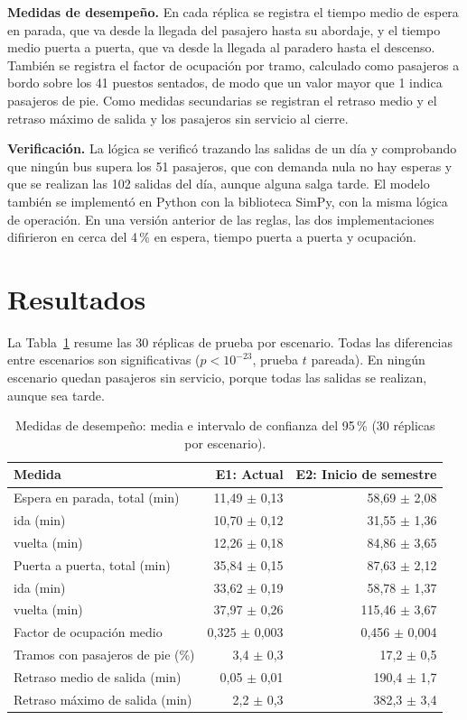 \documentclass[runningheads]{llncs}
\begin{document}
\textbf{Medidas de desempeño.} En cada réplica se registra el tiempo medio de espera en parada, que va desde la llegada del pasajero hasta su abordaje, y el tiempo medio puerta a puerta, que va desde la llegada al paradero hasta el descenso. También se registra el factor de ocupación por tramo, calculado como pasajeros a bordo sobre los 41 puestos sentados, de modo que un valor mayor que 1 indica pasajeros de pie. Como medidas secundarias se registran el retraso medio y el retraso máximo de salida y los pasajeros sin servicio al cierre.

\textbf{Verificación.} La lógica se verificó trazando las salidas de un día y comprobando que ningún bus supera los 51 pasajeros, que con demanda nula no hay esperas y que se realizan las 102 salidas del día, aunque alguna salga tarde. El modelo también se implementó en Python con la biblioteca SimPy, con la misma lógica de operación. En una versión anterior de las reglas, las dos implementaciones difirieron en cerca del 4\,\% en espera, tiempo puerta a puerta y ocupación.

\section{Resultados}

La Tabla~\ref{tab:resultados} resume las 30 réplicas de prueba por escenario. Todas las diferencias entre escenarios son significativas ($p<10^{-23}$, prueba $t$ pareada). En ningún escenario quedan pasajeros sin servicio, porque todas las salidas se realizan, aunque sea tarde.

\begin{table}[t]
\centering
\caption{Medidas de desempeño: media e intervalo de confianza del 95\,\% (30 réplicas por escenario).}
\label{tab:resultados}
\setlength{\tabcolsep}{6pt}
\begin{tabular}{lrr}
\toprule
Medida & E1: Actual & E2: Inicio de semestre\\
\midrule
Espera en parada, total (min) & 11,49 $\pm$ 0,13 & 58,69 $\pm$ 2,08\\
\quad ida (min) & 10,70 $\pm$ 0,12 & 31,55 $\pm$ 1,36\\
\quad vuelta (min) & 12,26 $\pm$ 0,18 & 84,86 $\pm$ 3,65\\
Puerta a puerta, total (min) & 35,84 $\pm$ 0,15 & 87,63 $\pm$ 2,12\\
\quad ida (min) & 33,62 $\pm$ 0,19 & 58,78 $\pm$ 1,37\\
\quad vuelta (min) & 37,97 $\pm$ 0,26 & 115,46 $\pm$ 3,67\\
Factor de ocupación medio & 0,325 $\pm$ 0,003 & 0,456 $\pm$ 0,004\\
Tramos con pasajeros de pie (\%) & 3,4 $\pm$ 0,3 & 17,2 $\pm$ 0,5\\
Retraso medio de salida (min) & 0,05 $\pm$ 0,01 & 190,4 $\pm$ 1,7\\
Retraso máximo de salida (min) & 2,2 $\pm$ 0,3 & 382,3 $\pm$ 3,4\\
\bottomrule
\end{tabular}
\end{table}
\end{document}
